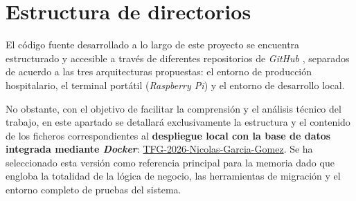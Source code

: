 
\section{Estructura de directorios}
El código fuente desarrollado a lo largo de este proyecto se encuentra estructurado y accesible a través de diferentes repositorios de \textit{GitHub} \cite{github}, separados de acuerdo a las tres arquitecturas propuestas: el entorno de producción hospitalario, el terminal portátil (\textit{Raspberry Pi}) y el entorno de desarrollo local. 

No obstante, con el objetivo de facilitar la comprensión y el análisis técnico del trabajo, en este apartado se detallará exclusivamente la estructura y el contenido de los ficheros correspondientes al \textbf{despliegue local con la base de datos integrada mediante \textit{Docker}}: \href{https://github.com/ngg1017/TFG-2026-Nicolas-Garcia-Gomez}{TFG-2026-Nicolas-Garcia-Gomez}. Se ha seleccionado esta versión como referencia principal para la memoria dado que engloba la totalidad de la lógica de negocio, las herramientas de migración y el entorno completo de pruebas del sistema.

